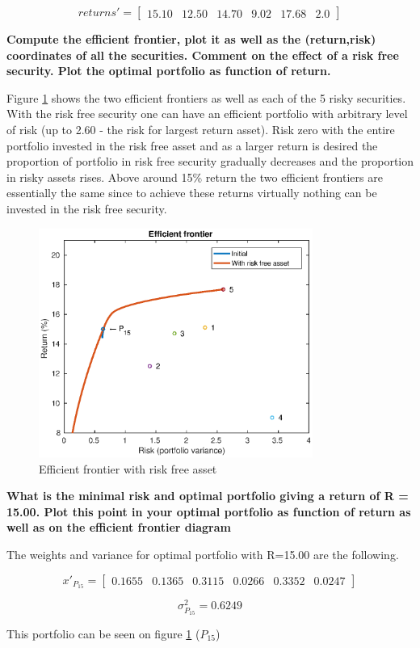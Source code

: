 \[returns'= \begin{bmatrix}
 	15.10 & 12.50 & 14.70 & 9.02 & 17.68 & 2.0
\end{bmatrix}
\]



\textbf{Compute the efficient frontier, plot it as well as the (return,risk) coordinates of all the securities. Comment on the effect of a risk free security. Plot the optimal portfolio as function of return.}

Figure \ref{fig:frontier_2} shows the two efficient frontiers as well as each of the 5 risky securities. With the risk free security one can have an efficient portfolio with arbitrary level of risk (up to 2.60 - the risk for largest return asset). Risk zero with the entire portfolio invested in the risk free asset and as a larger return is desired the proportion of portfolio in risk free security gradually decreases and the proportion in risky assets rises. Above around 15\% return the two efficient frontiers are essentially the same since to achieve these returns virtually nothing can be invested in the risk free security.

\begin{figure}
    \centering
    \includegraphics[width = 0.8\textwidth]{eff_front2.eps}
    \caption{Efficient frontier with risk free asset}
    \label{fig:frontier_2}
\end{figure}


\textbf{What is the minimal risk and optimal portfolio giving a return of R = 15.00. Plot this point in your optimal portfolio as function of return as well as on the efficient frontier diagram}

The weights and variance for optimal portfolio with R=15.00 are the following.

\[x'_{P_{15}}= \begin{bmatrix}
 	0.1655 & 0.1365 & 0.3115 & 0.0266 & 0.3352 & 0.0247
\end{bmatrix}
\]

\[\sigma_{P_{15}}^2 = 0.6249
\]

This portfolio can be seen on figure \ref{fig:frontier_2} ($P_{15}$)